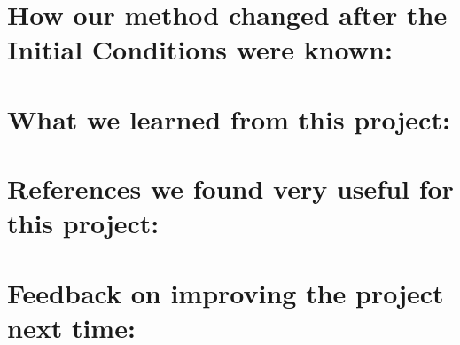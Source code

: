 \documentclass{article}
\begin{document}
\section{How our method changed after the Initial Conditions were known:}
\section{What we learned from this project:}
\section{References we found very useful for this project:}
\nocite{minjerk}
\nocite{acrl}



\section{Feedback on improving the project next time:}
\end{document}
